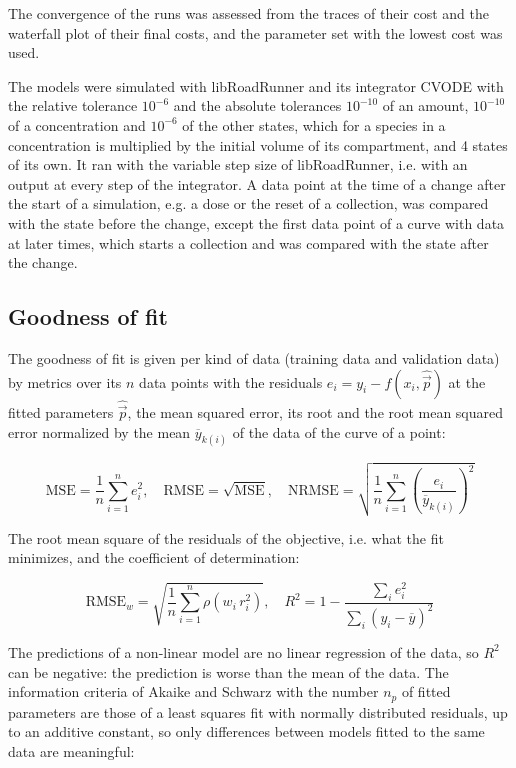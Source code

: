 \documentclass{article}
\begin{document}
The convergence of the runs was assessed from the traces of their cost and the waterfall plot of their final costs, and the parameter set with the lowest cost was used.

The models were simulated with libRoadRunner \cite{Welsh2023} and its integrator CVODE \cite{Hindmarsh2005} with the relative tolerance $10^{-6}$ and the absolute tolerances $10^{-10}$ of an amount, $10^{-10}$ of a concentration and $10^{-6}$ of the other states, which for a species in a concentration is multiplied by the initial volume of its compartment, and 4 states of its own. It ran with the variable step size of libRoadRunner, i.e. with an output at every step of the integrator. A data point at the time of a change after the start of a simulation, e.g. a dose or the reset of a collection, was compared with the state before the change, except the first data point of a curve with data at later times, which starts a collection and was compared with the state after the change.

\subsection{Goodness of fit}

The goodness of fit is given per kind of data (training data and validation data) by metrics over its $n$ data points with the residuals $e_i = y_i - f(x_i, \hat{\vec{p}})$ at the fitted parameters $\hat{\vec{p}}$, the mean squared error, its root and the root mean squared error normalized by the mean $\overline{y}_{k(i)}$ of the data of the curve of a point:

\begin{equation}
\mathrm{MSE} = \frac{1}{n} \sum_{i=1}^{n} e_i^2, \quad \mathrm{RMSE} = \sqrt{\mathrm{MSE}}, \quad \mathrm{NRMSE} = \sqrt{\frac{1}{n} \sum_{i=1}^{n} \left(\frac{e_i}{\overline{y}_{k(i)}}\right)^2}
\end{equation}

The root mean square of the residuals of the objective, i.e. what the fit minimizes, and the coefficient of determination:

\begin{equation}
\mathrm{RMSE}_w = \sqrt{\frac{1}{n} \sum_{i=1}^{n} \rho\left(w_i\, r_i^2\right)}, \quad R^2 = 1 - \frac{\sum_{i} e_i^2}{\sum_{i} \left(y_i - \overline{y}\right)^2}
\end{equation}

The predictions of a non-linear model are no linear regression of the data, so $R^2$ can be negative: the prediction is worse than the mean of the data. The information criteria of Akaike \cite{Akaike1974} and Schwarz \cite{Schwarz1978} with the number $n_p$ of fitted parameters are those of a least squares fit with normally distributed residuals, up to an additive constant, so only differences between models fitted to the same data are meaningful:
\end{document}
